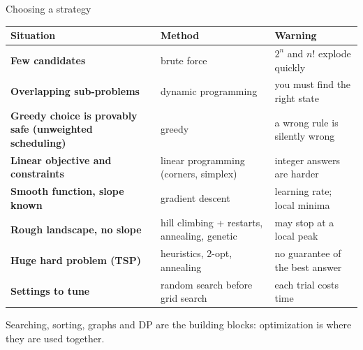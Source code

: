 \documentclass[aspectratio=169,10pt]{beamer}
\begin{document}
\begin{frame}{Choosing a strategy}
\renewcommand{\arraystretch}{1.05}\footnotesize
\begin{tabular}{@{}>{\raggedright\bfseries}p{36mm}>{\raggedright}p{44mm}>{\raggedright\arraybackslash}p{50mm}@{}}
\toprule Situation & Method & Warning\\\midrule
Few candidates & brute force & $2^n$ and $n!$ explode quickly\\
Overlapping sub-problems & dynamic programming & you must find the right state\\
Greedy choice is provably safe (unweighted scheduling) & greedy & a wrong rule is silently wrong\\
Linear objective and constraints & linear programming (corners, simplex) & integer answers are harder\\
Smooth function, slope known & gradient descent & learning rate; local minima\\
Rough landscape, no slope & hill climbing + restarts, annealing, genetic & may stop at a local peak\\
Huge hard problem (TSP) & heuristics, 2-opt, annealing & no guarantee of the best answer\\
Settings to tune & random search before grid search & each trial costs time\\\bottomrule
\end{tabular}

\vspace{2mm}
{\footnotesize Searching, sorting, graphs and DP are the building blocks: optimization is where they are used together.}
\end{frame}
\end{document}
